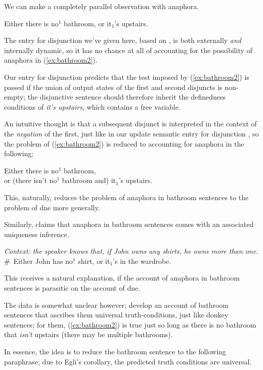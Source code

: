 \documentclass[nols,twoside,nofonts,nobib,nohyper]{tufte-handout}
\theoremstyle{observation}
\theoremstyle{theorem}
\theoremstyle{corollary}
\theoremstyle{definition}
\begin{document}
We can make a completely parallel observation with anaphora.

\ex
Either there is no$^{1}$ bathroom, or it$_{1}$'s upstairs.\label{ex:bathroom2}
\xe

The entry for disjunction we've given here, based on \citet{GroenendijkStokhof1991}, is both externally \textit{and} internally dynamic, so it has no chance at all of accounting for the possibility of anaphora in (\ref{ex:bathroom2}).


Our entry for disjunction predicts that the test imposed by (\ref{ex:bathroom2}) is passed if the union of output states of the first and second disjuncts is non-empty; the disjunctive sentence should therefore inherit the definedness conditions of \textit{it's upstairs}, which contains a free variable.

An intuitive thought is that a subsequent disjunct is interpreted in the context of the \textit{negation} of the first, just like in our update semantic entry for disjunction \citep{Beaver2001}, so the problem of (\ref{ex:bathroom2}) is reduced to accounting for anaphora in the following:

\ex
Either there is no$^{1}$ bathroom,\\
or (there isn't no$^{1}$ bathroom and) it$_{1}$'s upstairs.
\xe

This, naturally, reduces the problem of anaphora in bathroom sentences to the problem of \ac{dne} more generally.

Similarly, \citet{Gotham2019} claims that anaphora in bathroom sentences comes with an associated uniqueness inference.

\ex\textit{Context: the speaker knows that, if John owns any shirts, he owns more than one.}\\
\# Either John has no$^{1}$ shirt, or it$_{1}$'s in the wardrobe.
\xe

This receives a natural explanation, if the account of anaphora in bathroom sentences is parasitic on the account of \ac{dne}.

The data is somewhat unclear however; \citet{KrahmerMuskens1995} develop an account of bathroom sentences that ascribes them universal truth-conditions, just like donkey sentences; for them, (\ref{ex:bathroom2}) is true just so long as there is no bathroom that \textit{isn't} upstairs (there may be multiple bathrooms).

In essence, the idea is to reduce the bathroom sentence to the following paraphrase; due to Egli's corollary, the predicted truth conditions are universal.
\end{document}
